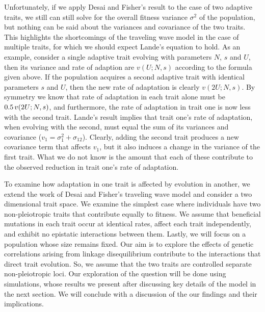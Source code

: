\documentclass[9pt,twocolumn,twoside]{gsajnl}
\begin{document}
Unfortunately, if we apply Desai and Fisher's result to the case of two adaptive traits, we still can still solve for the overall fitness variance $\sigma^2$ of the population, but nothing can be said about the variances and covariance of the two traits. This highlights the shortcomings of the traveling wave model in the case of multiple traits, for which we should expect Lande's equation to hold. As an example, consider a single adaptive trait evolving with parameters $N$, $s$ and $U$, then its variance and rate of adaption are $v(U;N,s)$ according to the formula given above. If the population acquires a second adaptive trait with identical parameters $s$ and $U$, then the new rate of adaptation is clearly $v(2U;N,s)$. By symmetry we know that rate of adaptation in each trait alone must be $0.5 \hspace{.02 in} v(2U;N,s)$, and furthermore, the rate of adaptation in trait one is now less with the second trait. Lande's result implies that trait one's rate of adaptation, when evolving with the second, must equal the sum of its variances and covariance ($v_1 =\sigma_1^2 +\sigma_{12}$). Clearly, adding the second trait produces a new covariance term that affects $v_1$, but it also induces a change in the variance of the first trait. What we do not know is the amount that each of these contribute to the observed reduction in trait one's rate of adaptation.\par
% 
% 
% 

To examine how adaptation in one trait is affected by evolution in another, we extend the work of Desai and Fisher's traveling wave model and consider a two dimensional trait space. We examine the simplest case where individuals have two non-pleiotropic traits that contribute equally to fitness. We assume that beneficial mutations in each trait occur at identical rates, affect each trait independently, and exhibit no epistatic interactions between them.  Lastly, we will focus on a population whose size remains fixed. Our aim is to explore the effects of genetic correlations arising from linkage disequilibrium contribute to the interactions that direct trait evolution. So, we assume that the two traits are controlled separate non-pleiotropic loci. Our exploration of the question will be done using simulations, whose results we present after discussing key details of the model in the next section. We will conclude with a discussion of the our findings and their implications.
% 
% 
\end{document}
